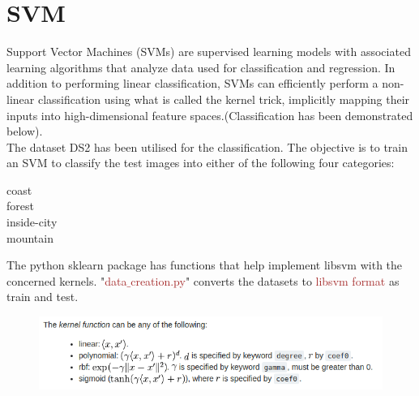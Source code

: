 \documentclass[paper=a4, fontsize=11pt]{scrartcl}
\numberwithin{equation}{section}		%
\numberwithin{figure}{section}			%
\numberwithin{table}{section}				%
\begin{document}
\begin{figure}[H]
  \hfill
\end{figure}

\section*{SVM}
Support Vector Machines (SVMs) are supervised learning models with associated learning algorithms that analyze data used for classification and regression. In addition to performing linear classification, SVMs can efficiently perform a non-linear classification using what is called the kernel trick, implicitly mapping their inputs into high-dimensional feature spaces.(Classification has been demonstrated below).\\
The dataset DS2 has been utilised for the classification. The objective is to train an SVM to classify the test images into either of the following four categories: 
\begin{center}
	{coast} \\
	{forest} \\
	{inside-city}\\ 
	{mountain}\\
\end{center}

The python sklearn package has functions that help implement libsvm with the concerned kernels. "\textcolor{Brown}{data$\_$creation.py}" converts the datasets to \textcolor{Brown}{libsvm format} as train and test.
\graphicspath{ {../EE15B025_PA2/Code/q4/} }
\begin{figure}[H]
\includegraphics[scale=0.72]{kernel}
\end{figure}
\end{document}
